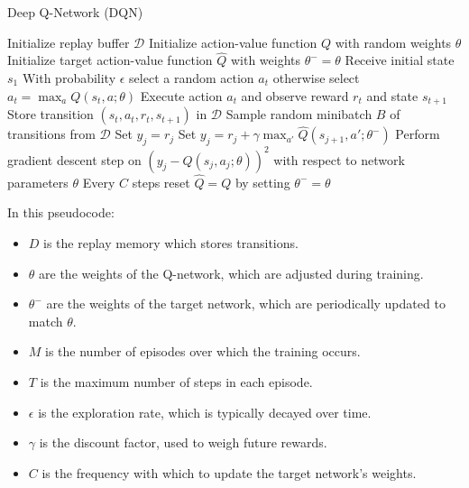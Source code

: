 \documentclass{article}
\begin{document}
\begin{algorithm}
\caption{Deep Q-Network (DQN)}
\begin{algorithmic}[1]

\State Initialize replay buffer $\mathcal{D}$
\State Initialize action-value function $Q$ with random weights $\theta$
\State Initialize target action-value function $\hat{Q}$ with weights $\theta^- = \theta$
    \State Receive initial state $s_1$
        \State With probability $\epsilon$ select a random action $a_t$
        \State otherwise select $a_t = \max_a Q(s_t, a; \theta)$
        \State Execute action $a_t$ and observe reward $r_t$ and state $s_{t+1}$
        \State Store transition $(s_t, a_t, r_t, s_{t+1})$ in $\mathcal{D}$
        \State Sample random minibatch $B$ of transitions from $\mathcal{D}$
                \State Set $y_j = r_j$
            \Else
                \State Set $y_j = r_j + \gamma \max_{a'}\hat{Q}(s_{j+1}, a'; \theta^-)$
            \EndIf
            \State Perform gradient descent step on $(y_j - Q(s_j, a_j; \theta))^2$ with respect to network parameters $\theta$
        \EndFor
        \State Every $C$ steps reset $\hat{Q} = Q$ by setting $\theta^- = \theta$
    \EndFor
\EndFor

\end{algorithmic}
\end{algorithm}

In this pseudocode:
\begin{itemize}
    \item $D$ is the replay memory which stores transitions.
    \item $\theta$ are the weights of the Q-network, which are adjusted during training.
    \item $\theta^-$ are the weights of the target network, which are periodically updated to match $\theta$.
    \item $M$ is the number of episodes over which the training occurs.
    \item $T$ is the maximum number of steps in each episode.
    \item $\epsilon$ is the exploration rate, which is typically decayed over time.
    \item $\gamma$ is the discount factor, used to weigh future rewards.
    \item $C$ is the frequency with which to update the target network's weights.
\end{itemize}
\end{document}
